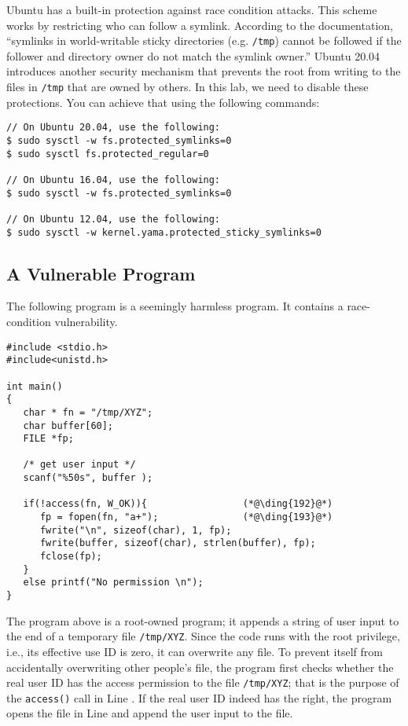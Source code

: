 Ubuntu has a built-in protection against race condition 
attacks. This scheme works by restricting who can follow a symlink. 
According to the documentation, ``symlinks in world-writable sticky 
directories (e.g. {\tt /tmp}) cannot be followed if the follower and directory 
owner do not match the symlink owner.''
Ubuntu 20.04 introduces another security mechanism that prevents the root 
from writing to the files in \texttt{/tmp} that are owned by others.  
In this lab, we need to disable these protections. You can achieve
that using the following commands:

\begin{lstlisting}
// On Ubuntu 20.04, use the following:
$ sudo sysctl -w fs.protected_symlinks=0
$ sudo sysctl fs.protected_regular=0

// On Ubuntu 16.04, use the following:
$ sudo sysctl -w fs.protected_symlinks=0

// On Ubuntu 12.04, use the following:
$ sudo sysctl -w kernel.yama.protected_sticky_symlinks=0
\end{lstlisting}


\subsection{A Vulnerable Program}


The following program is a seemingly harmless program. It contains a race-condition
vulnerability. 

\begin{lstlisting}[caption={The vulnerable program (\texttt{vulp.c})}]
#include <stdio.h>
#include<unistd.h>

int main()
{
   char * fn = "/tmp/XYZ";
   char buffer[60];
   FILE *fp;

   /* get user input */
   scanf("%50s", buffer );

   if(!access(fn, W_OK)){                 (*@\ding{192}@*)
      fp = fopen(fn, "a+");               (*@\ding{193}@*)
      fwrite("\n", sizeof(char), 1, fp);
      fwrite(buffer, sizeof(char), strlen(buffer), fp);
      fclose(fp);
   }
   else printf("No permission \n");
}
\end{lstlisting}

The program above is a root-owned \setuid program;
it appends a string of user input to
the end of a temporary file {\tt /tmp/XYZ}. Since the code runs
with the root privilege, i.e., its effective use ID is zero, it 
can overwrite any file. To prevent itself from accidentally
overwriting other people's file, the program first 
checks whether the real user ID has the access permission to the file
{\tt /tmp/XYZ}; that is the purpose of the {\tt access()} call in Line
.  If the real user ID indeed has 
the right, the program opens the file in Line  and append the user
input to the file. 

